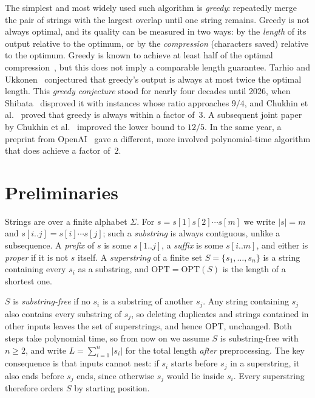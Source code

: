 \documentclass[11pt,a4paper]{article}   %
\theoremstyle{compact}
\theoremstyle{compactdef}
\newcommand{\OPT}{\mathrm{OPT}}
\begin{document}
The simplest and most widely used such algorithm is \emph{greedy}:
repeatedly merge the pair of strings with the largest overlap until one
string remains. Greedy is not always optimal, and its quality can be
measured in two ways: by the \emph{length} of its output relative to the
optimum, or by the \emph{compression} (characters saved) relative to the
optimum. Greedy is known to achieve at least half of the optimal
compression~\cite{TU88,Tur89,KN24}, but this does not imply a comparable
length guarantee. Tarhio and Ukkonen~\cite{TU88} conjectured that greedy's
output is always at most twice the optimal length. This \emph{greedy
conjecture} stood for nearly four decades until 2026, when
Shibata~\cite{Shi26} disproved it with instances whose ratio approaches
$9/4$, and Chukhin et al.~\cite{CKMS26} proved that greedy is always within
a factor of~$3$. A subsequent joint paper by Chukhin et al.~\cite{GSC26}
improved the lower bound to $12/5$. In the same year, a preprint from OpenAI~\cite{OAI26}
gave a different, more involved polynomial-time algorithm that does
achieve a factor of~$2$.


\section{Preliminaries}\label{sec:prelim}

Strings are over a finite alphabet $\Sigma$. For $s=s[1]s[2]\cdots s[m]$ we
write $|s|=m$ and $s[i..j]=s[i]\cdots s[j]$; such a \emph{substring} is
always contiguous, unlike a subsequence. A \emph{prefix} of $s$ is some
$s[1..j]$, a \emph{suffix} is some $s[i..m]$, and either is \emph{proper}
if it is not $s$ itself. A \emph{superstring} of a finite set
$S=\{s_1,\dots,s_n\}$ is a string containing every $s_i$ as a substring,
and $\OPT=\OPT(S)$ is the length of a shortest one.

$S$ is \emph{substring-free} if no $s_i$ is a substring of another $s_j$.
Any string containing $s_j$ also contains every substring of $s_j$, so
deleting duplicates and strings contained in other inputs leaves the set of
superstrings, and hence $\OPT$, unchanged. Both steps take polynomial time,
so from now on we assume $S$ is substring-free with $n\ge 2$, and write
$L=\sum_{i=1}^{n}|s_i|$ for the total length \emph{after} preprocessing.
The key consequence is that inputs cannot nest: if $s_i$ starts before
$s_j$ in a superstring, it also ends before $s_j$ ends, since otherwise
$s_j$ would lie inside $s_i$. Every superstring therefore orders $S$ by
starting position.
\end{document}
